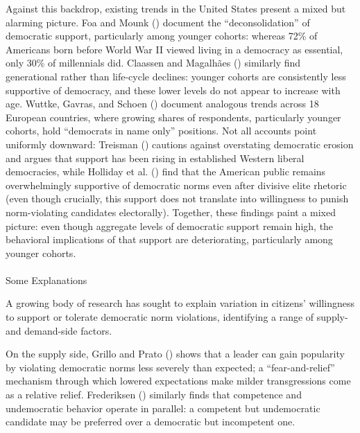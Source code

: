 \documentclass[
  10pt,
  letterpaper,
  DIV=11,
  numbers=noendperiod]{scrartcl}
\makeatletter
\let\oldparagraph\paragraph
\renewcommand{\paragraph}{
    \@ifstar
      \xxxParagraphStar
      \xxxParagraphNoStar
  }
\newcommand{\xxxParagraphStar}[1]{\oldparagraph*{#1}\mbox{}}
\newcommand{\xxxParagraphNoStar}[1]{\oldparagraph{#1}\mbox{}}
\makeatother
\begin{document}
Against this backdrop, existing trends in the United States present a
mixed but alarming picture. Foa and Mounk ()
document the ``deconsolidation'' of democratic support, particularly
among younger cohorts: whereas 72\% of Americans born before World War
II viewed living in a democracy as essential, only 30\% of millennials
did. Claassen and Magalhães ()
similarly find generational rather than life-cycle declines: younger
cohorts are consistently less supportive of democracy, and these lower
levels do not appear to increase with age. Wuttke, Gavras, and Schoen
() document analogous trends across 18
European countries, where growing shares of respondents, particularly
younger cohorts, hold ``democrats in name only'' positions. Not all
accounts point uniformly downward: Treisman
() cautions against overstating
democratic erosion and argues that support has been rising in
established Western liberal democracies, while Holliday et al.
() find that the American public
remains overwhelmingly supportive of democratic norms even after
divisive elite rhetoric (even though crucially, this support does not
translate into willingness to punish norm-violating candidates
electorally). Together, these findings paint a mixed picture: even
though aggregate levels of democratic support remain high, the
behavioral implications of that support are deteriorating, particularly
among younger cohorts.

\paragraph{Some Explanations}\label{some-explanations}

A growing body of research has sought to explain variation in citizens'
willingness to support or tolerate democratic norm violations,
identifying a range of supply- and demand-side factors.

On the supply side, Grillo and Prato ()
shows that a leader can gain popularity by violating democratic norms
less severely than expected; a ``fear-and-relief'' mechanism through
which lowered expectations make milder transgressions come as a relative
relief. Frederiksen () similarly
finds that competence and undemocratic behavior operate in parallel: a
competent but undemocratic candidate may be preferred over a democratic
but incompetent one.
\end{document}
